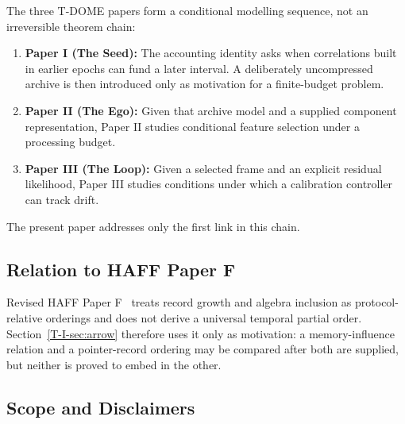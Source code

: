 \documentclass[12pt,a4paper,openany]{book}
\begin{document}
The three T-DOME papers form a conditional modelling sequence,
not an irreversible theorem chain:
\begin{enumerate}
\item \textbf{Paper I (The Seed):} The accounting identity asks when
  correlations built in earlier epochs can fund a later interval.
  A deliberately uncompressed archive is then introduced only as
  motivation for a finite-budget problem.
\item \textbf{Paper II (The Ego):} Given that archive model and a
  supplied component representation, Paper II studies conditional
  feature selection under a processing budget.
\item \textbf{Paper III (The Loop):} Given a selected frame and an
  explicit residual likelihood, Paper III studies conditions under
  which a calibration controller can track drift.
\end{enumerate}

\noindent
The present paper addresses only the first link in this chain.

\subsection{Relation to HAFF Paper F}

Revised HAFF Paper F~\cite{Liu2026HAFF_F} treats record growth and
algebra inclusion as protocol-relative orderings and does not derive
a universal temporal partial order.  Section~\ref{T-I-sec:arrow} therefore
uses it only as motivation: a memory-influence relation and a
pointer-record ordering may be compared after both are supplied, but
neither is proved to embed in the other.

\subsection{Scope and Disclaimers}
\end{document}
